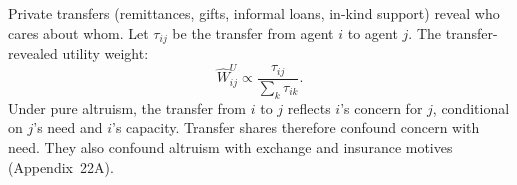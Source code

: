 \documentclass[../structural_economics_book.tex]{subfiles}
\begin{document}
\begin{definition}\label{ch22:def:transfer_WU}
Private transfers (remittances, gifts, informal loans, in-kind support) reveal who cares about whom. Let $\tau_{ij}$ be the transfer from agent $i$ to agent $j$. The transfer-revealed utility weight:
\begin{equation}\label{ch22:eq:transfer_WU}
\hat{W}^U_{ij} \propto \frac{\tau_{ij}}{\sum_k \tau_{ik}}.
\end{equation}
Under pure altruism, the transfer from $i$ to $j$ reflects $i$'s concern for $j$, conditional on $j$'s need and $i$'s capacity. Transfer shares therefore confound concern with need. They also confound altruism with exchange and insurance motives (Appendix~22A).
\end{definition}
\end{document}
